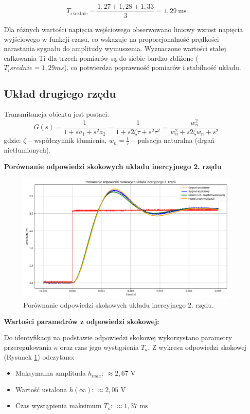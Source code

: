 \documentclass[12pt,a4paper]{article}
\begin{document}
	\[
	T_{i\,\text{średnie}} = \frac{1,27 + 1,28 + 1,33}{3} = 1,29\ \text{ms}
	\]
	
	Dla różnych wartości napięcia wejściowego obserwowano liniowy wzrost napięcia wyjściowego w funkcji czasu, co wskazuje na proporcjonalność prędkości narastania sygnału do amplitudy wymuszenia. Wyznaczone wartości stałej całkowania Ti dla trzech pomiarów są do siebie bardzo zbliżone ($T_isrednie = 1,29 ms$), co potwierdza poprawność pomiarów i stabilność układu.
	
	\subsection{Układ drugiego rzędu}
	Transmitancja obiektu jest postaci:
	\begin{equation}
		G(s) = \frac{1}{1 + sa_1 + s^2a_2}
		= \frac{1}{1+s 2\zeta \tau + s^2 \tau^2}
		= \frac{w_n^2}{w_n^2 + s 2 \zeta w_n + s^2}
	\end{equation}
	gdzie: \(\zeta\) – współczynnik tłumienia, \(w_n = \frac{1}{\tau}\) – pulsacja naturalna (drgań nietłumionych).
	
	\textbf{Porównanie odpowiedzi skokowych układu inercyjnego 2. rzędu}
	\begin{figure}[H]
		\centering
		\includegraphics[width=1\linewidth]{zdjecia/ukl2.png}
		\caption{Porównanie odpowiedzi skokowych układu inercyjnego 2. rzędu.}
		\label{fig:OdpSkokowa2}
	\end{figure}
	
	\textbf{Wartości parametrów z odpowiedzi skokowej:}
	
	Do identyfikacji na podstawie odpowiedzi skokowej wykorzystano parametry przeregulowania \(\kappa\) oraz czas jego wystąpienia \(T_{\kappa}\). Z wykresu odpowiedzi skokowej (Rysunek \ref{fig:OdpSkokowa2}) odczytano:
	\begin{itemize}
		\item Maksymalna amplituda \(h_{max}\): $\approx 2,67 \text{ V}$
		\item Wartość ustalona \(h(\infty)\): $\approx 2,05 \text{ V}$
		\item Czas wystąpienia maksimum \(T_{\kappa}\): $\approx 1,37 \text{ ms}$
	\end{itemize}
	
\end{document}
